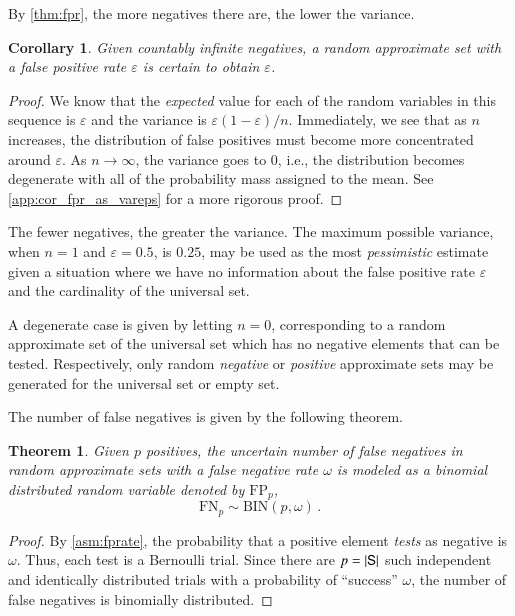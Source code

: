 \documentclass[10pt,final,hidelinks]{article}
\numberwithin{equation}{section}
\DeclarePairedDelimiter\Card{\lvert}{\rvert}
\newcommand{\FP}{\RV{FP}}
\newcommand{\FN}{\RV{FN}}
\newcommand{\fprate}{\varepsilon}
\newcommand{\fnrate}{\omega}
\newcommand{\RV}[1]{\mathrm{#1}}
\newcommand{\bindist}{\mathrm{BIN}}
\newcommand{\envnumstyle}{chapter}
\renewcommand{\envnumstyle}{chapter}
\renewcommand{\envnumstyle}{section}
\theoremstyle{plain}
\newtheorem{theorem}{Theorem}[\envnumstyle]
\newtheorem{corollary}{Corollary}[theorem]
\begin{document}
By \cref{thm:fpr}, the more negatives there are, the lower the variance.
\begin{corollary}
\label{cor:fpr_as_vareps}
	Given \emph{countably infinite} negatives, a random approximate set with a false positive rate $\fprate$ is \emph{certain} to obtain $\fprate$.
\end{corollary}
\begin{proof}
We know that the \emph{expected} value for each of the random variables in this sequence is $\fprate$ and the variance is $\fprate(1-\fprate)/n$.
Immediately, we see that as $n$ increases, the distribution of false positives must become more concentrated around $\fprate$.
As $n \to \infty$, the variance goes to $0$, i.e., the distribution becomes degenerate with all of the probability mass assigned to the mean. See \cref{app:cor_fpr_as_vareps} for a more rigorous proof.
\end{proof}

The fewer negatives, the greater the variance.
The maximum possible variance, when $n=1$ and $\fprate = 0.5$, is $0.25$, may be used as the most \emph{pessimistic} estimate given a situation where we have no information about the false positive rate $\fprate$ and the cardinality of the universal set.

A degenerate case is given by letting $n = 0$, corresponding to a random approximate set of the universal set which has no negative elements that can be tested.
Respectively, only random \emph{negative} or \emph{positive} approximate sets may be generated for the universal set or empty set.

The number of false negatives is given by the following theorem.
\begin{theorem}
\label{thm:fnbinom}
Given $p$ positives, the uncertain number of \emph{false negatives} in random approximate sets with a false negative rate $\fnrate$ is modeled as a binomial distributed random variable denoted by $\FP_p$,
\begin{equation}
	\FN_p \sim \bindist(p, \fnrate)\,.
\end{equation}
\end{theorem}
\begin{proof}
By \cref{asm:fprate}, the probability that a positive element \emph{tests} as negative is $\fnrate$.
Thus, each test is a Bernoulli trial.
Since there are $p = \Card{\Set{S}}$ such independent and identically distributed trials with a probability of ``success'' $\fnrate$, the number of false negatives is binomially distributed.
\end{proof}
\end{document}

